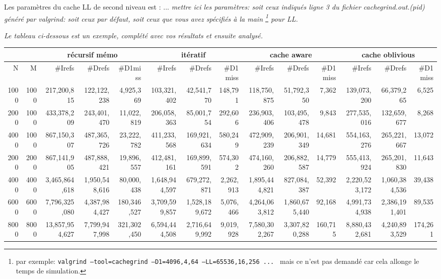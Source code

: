 \documentclass[10pt,a4paper]{article}
\begin{document}
Les paramètres du cache LL de second niveau est : ...
{\em mettre ici les paramètres: soit ceux indiqués ligne 3
du fichier cachegrind.out.(pid) généré par valgrind: soit ceux par défaut,
soit ceux que vous avez spécifiés à la main
\footnote{par exemple:
{\tt valgrind --tool=cachegrind --D1=4096,4,64 --LL=65536,16,256  ... }
mais ce n'est pas demandé car cela allonge le temps de simulation. } 
 pour LL. }

{\em Le tableau ci-dessous est un exemple,  complété avec vos résultats et 
ensuite analysé.}
\\
{\footnotesize
\begin{tabular}{|r|r||r|r|r||r|r|r||r|r|r||r|r|r||}
\hline
 \multicolumn{2}{|c||}{ } 
& \multicolumn{3}{c||}{récursif mémo}
& \multicolumn{3}{c||}{itératif}
& \multicolumn{3}{c||}{cache aware}
& \multicolumn{3}{c||}{cache oblivious}
\\ \hline
N & M 
& \#Irefs & \#Drefs & \#D1miss %
& \#Irefs & \#Drefs & \#D1miss %
& \#Irefs & \#Drefs & \#D1miss %
& \#Irefs & \#Drefs & \#D1miss %
\\ \hline
\hline
1000 & 1000 
& 217,200,815 & 122,122,238 & 4,925,369  %
& 103,321,402 & 42,541,770 & 148,791  %
& 118,750,875 & 51,792,350 & 7,362  %
& 139,073,200 & 66,379,265 & 6,525  %
\\ \hline
2000 & 1000 
& 433,378,209 & 243,401,470 & 11,022,819  %
& 206,058,363 & 85,001,754 & 292,606  %
& 236,903,406 & 103,495,478 & 9,843  %
& 277,535,016 & 132,659,677 & 8,268  %
\\ \hline
4000 & 1000 
& 867,150,307 & 487,365,726 & 23,222,782  %
& 411,233,568 & 169,921,634 & 580,249  %
& 472,909,239 & 206,901,349 & 14,681  %
& 554,163,276 & 265,221,667 & 13,072  %
\\ \hline
2000 & 2000 
& 867,141,905 & 487,888,421 & 19,896,557  %
& 412,481,161 & 169,899,591 & 574,302  %
& 474,160,260 & 206,882,587 & 14,779  %
& 555,413,924 & 265,201,830 & 11,643  %
\\ \hline
4000 & 4000 
& 3,465,864,618 & 1,950,548,616 & 80,000,438  %
& 1,648,944,597 & 679,272,871 & 2,262,913  %
& 1,895,444,821 & 827,084,387 & 52,392  %
& 2,220,523,172 & 1,060,384,536 & 39,438  %
\\ \hline
6000 & 6000 
& 7,796,325,080 & 4,387,984,427 & 180,346,527  %
& 3,709,599,857 & 1,528,189,672 & 5,076,466  %
& 4,264,063,812 & 1,860,675,440 & 92,168  %
& 4,991,734,938 & 2,386,191,401 & 89,535  %
\\ \hline
8000 & 8000 
& 13,857,954,627 & 7,799,947,998 & 321,302,450  %
& 6,594,444,508 & 2,716,649,992 & 9,019,928  %
& 7,580,302,267 & 3,307,820,288 & 160,715  %
& 8,880,432,681 & 4,240,893,529 & 174,261 %
\\ \hline
\hline
\end{tabular}
}
\end{document}
